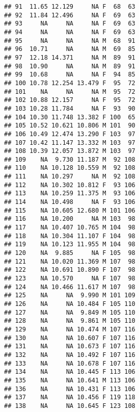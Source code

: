 \documentclass{article}\usepackage[]{graphicx}\usepackage[]{color}
\makeatletter
\newenvironment{kframe}{%
 \def\at@end@of@kframe{}%
 \ifinner\ifhmode%
  \def\at@end@of@kframe{\end{minipage}}%
  \begin{minipage}{\columnwidth}%
 \fi\fi%
 \def\FrameCommand##1{\hskip\@totalleftmargin \hskip-\fboxsep
 \colorbox{shadecolor}{##1}\hskip-\fboxsep
     \hskip-\linewidth \hskip-\@totalleftmargin \hskip\columnwidth}%
 \MakeFramed {\advance\hsize-\width
   \@totalleftmargin\z@ \linewidth\hsize
   \@setminipage}}%
 {\par\unskip\endMakeFramed%
 \at@end@of@kframe}
\newenvironment{knitrout}{}{} %
\makeatother
\begin{document}
\begin{knitrout}
\begin{kframe}
\begin{verbatim}
## 91  11.65 12.129     NA F  68  63
## 92  11.84 12.496     NA F  69  63
## 93     NA     NA     NA F  69  63
## 94     NA     NA     NA F  69  63
## 95     NA     NA     NA M  68  91
## 96  10.71     NA     NA M  69  85
## 97  12.18 14.371     NA M  89  91
## 98  10.90     NA     NA M  89  91
## 99  10.68     NA     NA F  94  85
## 100 10.78 12.254 13.479 F  95  72
## 101    NA     NA     NA M  95  72
## 102 10.88 12.157     NA F  95  72
## 103 10.28 11.784     NA F  93  90
## 104 10.30 11.748 13.382 F 100  65
## 105 10.52 10.621 10.806 M 101  90
## 106 10.49 12.474 13.290 F 103  97
## 107 10.42 11.147 13.332 M 103  97
## 108 10.39 12.057 13.872 M 103  97
## 109    NA  9.730 11.187 M  92 108
## 110    NA 10.128 10.559 M  92 108
## 111    NA 10.297     NA M  92 108
## 112    NA 10.302 10.812 F  93 106
## 113    NA 10.259 11.375 M  93 106
## 114    NA 10.498     NA F  93 106
## 115    NA 10.605 12.680 M 101 106
## 116    NA 10.200     NA M 103  98
## 117    NA 10.407 10.765 M 104  98
## 118    NA 10.304 11.107 F 104  98
## 119    NA 10.123 11.955 M 104  98
## 120    NA  9.885     NA F 105  98
## 121    NA 10.020 11.369 M 107  98
## 122    NA 10.691 10.890 F 107  98
## 123    NA 10.570     NA F 107  98
## 124    NA 10.466 11.617 M 107  98
## 125    NA     NA  9.990 M 101 109
## 126    NA     NA 10.484 F 105 110
## 127    NA     NA  9.849 M 105 110
## 128    NA     NA  9.861 M 105 110
## 129    NA     NA 10.474 M 107 116
## 130    NA     NA 10.607 F 107 116
## 131    NA     NA 10.673 F 107 116
## 132    NA     NA 10.492 F 107 116
## 133    NA     NA 10.678 F 107 116
## 134    NA     NA 10.445 F 113 106
## 135    NA     NA 10.641 M 113 106
## 136    NA     NA 10.431 F 113 106
## 137    NA     NA 10.456 F 119 118
## 138    NA     NA 10.645 F 123 108
\end{verbatim}
\end{kframe}
\end{knitrout}
\end{document}
